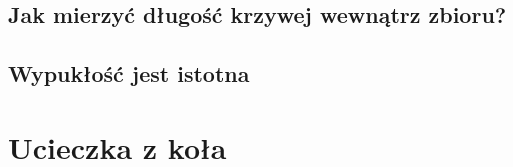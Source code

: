 \documentclass[aspectratio=169]{beamer}
\begin{document}
\begin{frame}
\begin{columns}
  \begin{column}{0.5\textwidth}
    \begin{figure}
      {\curveComparisonLogoTex}
    \end{figure}
  \end{column}
  \begin{column}{0.5\textwidth}
    \begin{figure}
      {\curveComparisonAzimuthTex}
    \end{figure}
  \end{column}
\end{columns}
\end{frame}

\subsection{Jak mierzyć długość krzywej wewnątrz zbioru?}
{\lengthInsideExampleTex}
\subsection{Wypukłość jest istotna}
{\lengthInsideExampleNonconvexTex}

\section{Ucieczka z koła}

\begin{frame}
\begin{figure}
  	{\escapeFromCircleExTex}
\end{figure}
\end{frame}

\begin{frame}
\begin{columns}
\begin{column}{0.5\textwidth}
  \begin{figure}
    	{\escapeFromCircleLogoTex}
  \end{figure}
\end{column}
\begin{column}{0.5\textwidth}
  \begin{figure}
    	{\escapeFromCircleAzimuthTex}
  \end{figure}
\end{column}
\end{columns}
\end{frame}
\end{document}
